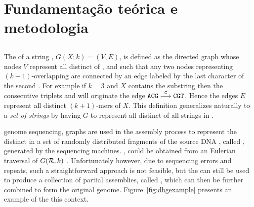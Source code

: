 \chapter{Fundamentação teórica e metodologia}


\section{}


The  of a string , $G(X;k)=(V,E)$, is defined as the directed graph whose nodes $V$ represent all distinct  of , and such that any two nodes representing $(k-1)$-overlapping \kmers are connected by an edge labeled by the last character of the second \kmer. For example if $k=3$ and $X$ contains the substring  then the consecutive triplets  and  will originate the edge $\mathtt{ACG}\stackrel{\mathtt{C}}{\longrightarrow}\mathtt{CGT}$. Hence the edges $E$ represent all distinct $(k+1)$-mers of $X$. 
This definition generalizes naturally to a \emph{set of strings}  by having $G$ to represent all distinct  of all strings in .

 genome sequencing, \dB graphs are used in the assembly process to represent the distinct \kmers in a set \readset of randomly distributed fragments of the source DNA , called , generated by the sequencing machines. ,  could be obtained from an Eulerian traversal of $G(\readset, k)$ \cite{}. Unfortunately however, due to sequencing errors and repeats, such a straightforward approach is not feasible, but the \dBG can still be used to produce a collection of partial assemblies, called , which can then be further combined to form the original genome. Figure~\ref{fig:dbgexample} presents an example of the \dBG {} this context.

